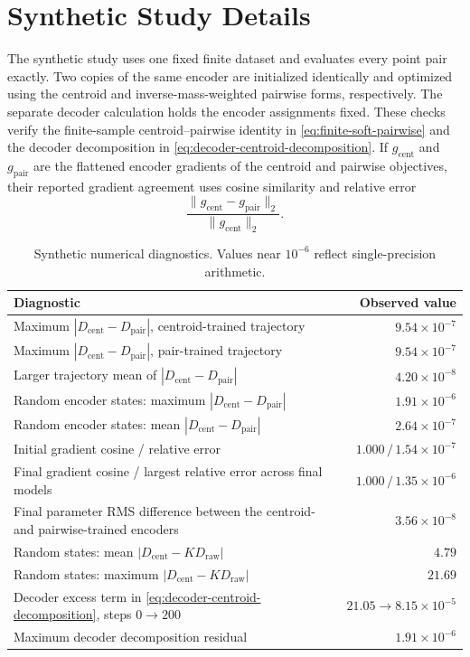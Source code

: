 \section{Synthetic Study Details}
\label{app:synthetic-details}

The synthetic study uses one fixed finite dataset and evaluates every point pair exactly.
Two copies of the same encoder are initialized identically and optimized using the centroid and inverse-mass-weighted pairwise forms, respectively.
The separate decoder calculation holds the encoder assignments fixed.
These checks verify the finite-sample centroid--pairwise identity in \cref{eq:finite-soft-pairwise} and the decoder decomposition in \cref{eq:decoder-centroid-decomposition}.
If $g_{\mathrm{cent}}$ and $g_{\mathrm{pair}}$ are the flattened encoder gradients of the centroid and pairwise objectives, their reported gradient agreement uses cosine similarity and relative error
\[
\frac{\|g_{\mathrm{cent}}-g_{\mathrm{pair}}\|_2}
{\|g_{\mathrm{cent}}\|_2}.
\]

\begin{table}[htbp]
\centering\small
\begin{tabularx}{\linewidth}{Xr}
\toprule
Diagnostic & Observed value \\
\midrule
Maximum $|D_{\mathrm{cent}}-D_{\mathrm{pair}}|$, centroid-trained trajectory & $9.54\times10^{-7}$ \\
Maximum $|D_{\mathrm{cent}}-D_{\mathrm{pair}}|$, pair-trained trajectory & $9.54\times10^{-7}$ \\
Larger trajectory mean of $|D_{\mathrm{cent}}-D_{\mathrm{pair}}|$ & $4.20\times10^{-8}$ \\
Random encoder states: maximum $|D_{\mathrm{cent}}-D_{\mathrm{pair}}|$ & $1.91\times10^{-6}$ \\
Random encoder states: mean $|D_{\mathrm{cent}}-D_{\mathrm{pair}}|$ & $2.64\times10^{-7}$ \\
Initial gradient cosine / relative error & $1.000\,/\,1.54\times10^{-7}$ \\
Final gradient cosine / largest relative error across final models & $1.000\,/\,1.35\times10^{-6}$ \\
Final parameter RMS difference between the centroid- and pairwise-trained encoders & $3.56\times10^{-8}$ \\
Random states: mean $|D_{\mathrm{cent}}-KD_{\mathrm{raw}}|$ & $4.79$ \\
Random states: maximum $|D_{\mathrm{cent}}-KD_{\mathrm{raw}}|$ & $21.69$ \\
Decoder excess term in \cref{eq:decoder-centroid-decomposition}, steps $0\to200$ & $21.05\to8.15\times10^{-5}$ \\
Maximum decoder decomposition residual & $1.91\times10^{-6}$ \\
\bottomrule
\end{tabularx}
\caption{Synthetic numerical diagnostics. Values near $10^{-6}$ reflect single-precision arithmetic.}
\label{tab:synthetic-collision-centroid}
\end{table}

